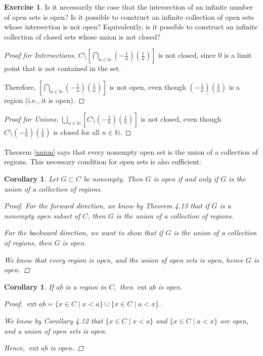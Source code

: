 \documentclass[11pt]{article}
\newcommand{\bbN}{\mathbb{N}}
\renewcommand{\_}[1]{\underline{ #1 }}
\DeclareMathOperator{\ext}{ext}
\newtheorem{corollary}[theorem]{Corollary}
\theoremstyle{definition}
\newtheorem{exercise}[theorem]{Exercise}
\numberwithin{equation}{subsection}
\begin{document}
\begin{exercise}  Is it necessarily the case that the intersection of an infinite number of open sets is open? Is it possible to construct an infinite collection of open sets whose intersection is not open?  Equivalently, is it possible to construct an infinite collection of closed sets whose union is not closed?
\begin{proof}[Proof for Intersections]
$C \setminus \left[\bigcap_{n \in \bbN} \_{(-\frac{1}{n})(\frac{1}{n})}\right]$ is not closed, since $0$ is a limit point that is not contained in the set.

Therefore, $\left[\bigcap_{n \in \bbN} \_{(-\frac{1}{n})(\frac{1}{n})}\right]$ is not open, even though $\_{(-\frac{1}{n})(\frac{1}{n})}$ is a region (i.e., it is open).

\renewcommand\qedsymbol{QED}
\end{proof}

\begin{proof}[Proof for Unions]
$\bigcup_{n \in \bbN} \left[C \setminus \_{(-\frac{1}{n})(\frac{1}{n})}\right]$ is not closed, even though $C \setminus \_{(-\frac{1}{n})(\frac{1}{n})}$ is closed for all $n \in \bbN$.



\renewcommand\qedsymbol{QED}
\end{proof}

\end{exercise} 

Theorem \ref{union} says that every nonempty open set is the union of a collection of regions.  This necessary condition for open sets is also sufficient:


 \begin{corollary}  Let $G \subset C$ be nonempty.  Then $G$ is open if and only if $G$ is the union of a collection of regions.
 \begin{proof}
For the forward direction, we know by Theorem 4.13 that if $G$ is a nonempty open subset of $C$, then $G$ is the union of a collection of regions.

For the backward direction, we want to show that if $G$ is the union of a collection of regions, then $G$ is open.

We know that every region is open, and the union of open sets is open, hence $G$ is open.

\renewcommand\qedsymbol{QED}
\end{proof}
\end{corollary}

\begin{corollary} If $\underline{ab}$ is a region in $C,$ then $\ext{\_{ab}}$ is open.
\begin{proof}
$\ext{\_{ab}} = \{ x \in C \mid x < a\} \cup \{x\in C \mid a < x \}$.

We know by Corollary 4.12 that $\{ x \in C \mid x < a\}$ and $\{x\in C \mid a < x \}$ are open, and a union of open sets is open.

Hence, $\ext{\_{ab}}$ is open.

\renewcommand\qedsymbol{QED}
\end{proof}
\end{corollary} 
\end{document}

